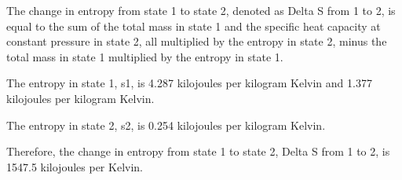 The change in entropy from state 1 to state 2, denoted as Delta S from 1 to 2, is equal to the sum of the total mass in state 1 and the specific heat capacity at constant pressure in state 2, all multiplied by the entropy in state 2, minus the total mass in state 1 multiplied by the entropy in state 1.

The entropy in state 1, s1, is 4.287 kilojoules per kilogram Kelvin and 1.377 kilojoules per kilogram Kelvin.

The entropy in state 2, s2, is 0.254 kilojoules per kilogram Kelvin.

Therefore, the change in entropy from state 1 to state 2, Delta S from 1 to 2, is 1547.5 kilojoules per Kelvin.